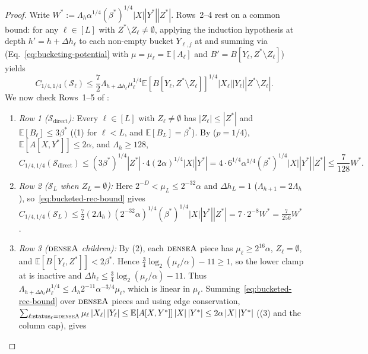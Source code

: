 \documentclass[11pt]{article}
\theoremstyle{definition}
\renewcommand{\label}[1]{}%
\newcommand{\E}{\mathbb{E}}
\newcommand{\abs}[1]{\left\lvert #1 \right\rvert}
\newcommand{\dens}[1]{\E[#1]}
\newcommand{\pot}{C_{1/4,1/4}}
\newcommand{\tagdenseA}{\textnormal{\textsc{denseA}}}
\begin{document}
\begin{proof}
Write $W^* := \Lambda_h \alpha^{1/4}(\beta^*)^{1/4}\abs{X}\abs{Y^*}\abs{Z^*}$. Rows~2--4 rest on a common bound: for any $\ell \in [L]$ with $Z^* \setminus Z_\ell \ne \emptyset$, applying the induction hypothesis at depth $h' = h + \Delta h_\ell$ to each non-empty bucket $Y_{\ell, j}$ at  and summing via  (Eq.~\eqref{eq:bucketing-potential} with $\mu = \mu_\ell = \dens{A_\ell}$ and $B' = B[Y_\ell, Z^* \setminus Z_\ell]$) yields
\begin{equation}\label{eq:bucketed-rec-bound}
    \pot(\mathcal{S}_\ell) \le \frac{7}{2}\Lambda_{h + \Delta h_\ell} \mu_\ell^{1/4}\dens{B[Y_\ell, Z^* \setminus Z_\ell]}^{1/4}\abs{X_\ell}\abs{Y_\ell}\abs{Z^* \setminus Z_\ell}.
\end{equation}
We now check Rows~1--5 of :
\begin{enumerate}[label=\arabic*.]
    \item \emph{Row 1 ($\mathcal{S}_{\text{direct}}$):} Every $\ell \in [L]$ with $Z_\ell \ne \emptyset$ has $\abs{Z_\ell} \le \abs{Z^*}$ and $\dens{B_\ell} \le 3\beta^*$ ((1) for $\ell < L$, and $\dens{B_L} = \beta^*$). By  ($p = 1/4$), $\dens{A[X, Y^*]} \le 2\alpha$, and $\Lambda_h \ge 128$,
    \[
        \pot(\mathcal{S}_{\text{direct}}) \le (3\beta^*)^{1/4}\abs{Z^*} \cdot 4(2\alpha)^{1/4}\abs{X}\abs{Y^*} = 4 \cdot 6^{1/4}\alpha^{1/4}(\beta^*)^{1/4}\abs{X}\abs{Y^*}\abs{Z^*} \le \frac{7}{128} W^*.
    \]
    \item \emph{Row 2 ($\mathcal{S}_L$ when $Z_L = \emptyset$):} Here $2^{-D} < \mu_L \le 2^{-32}\alpha$ and $\Delta h_L = 1$ ($\Lambda_{h+1} = 2\Lambda_h$), so~\eqref{eq:bucketed-rec-bound} gives $\pot(\mathcal{S}_L) \le \frac{7}{2}(2\Lambda_h)(2^{-32}\alpha)^{1/4}(\beta^*)^{1/4}\abs{X}\abs{Y^*}\abs{Z^*} = 7 \cdot 2^{-8} W^* = \frac{7}{256} W^*$.
    \item \emph{Row 3 ($\tagdenseA$ children):} By (2), each $\tagdenseA$ piece has $\mu_\ell \ge 2^{16}\alpha$, $Z_\ell = \emptyset$, and $\dens{B[Y_\ell, Z^*]} < 2\beta^*$. Hence $\frac{3}{4}\log_2(\mu_\ell/\alpha) - 11 \ge 1$, so the lower clamp at  is inactive and $\Delta h_\ell \le \frac{3}{4}\log_2(\mu_\ell/\alpha) - 11$. Thus $\Lambda_{h + \Delta h_\ell}\mu_\ell^{1/4} \le \Lambda_h 2^{-11}\alpha^{-3/4}\mu_\ell$, which is linear in $\mu_\ell$. Summing~\eqref{eq:bucketed-rec-bound} over $\tagdenseA$ pieces and using edge conservation, $\sum_{\ell : \text{status}_\ell = \tagdenseA} \mu_\ell\abs{X_\ell}\abs{Y_\ell} \le \dens{A[X, Y^*]}\abs{X}\abs{Y^*} \le 2\alpha\abs{X}\abs{Y^*}$ ((3) and the column cap), gives

\end{enumerate}
\end{proof}
\end{document}
